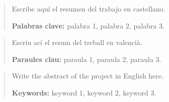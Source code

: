 
\begin{abstract}
	Escribe aquí el resumen del trabajo en castellano.

	\bigskip
	\textbf{Palabras clave:} palabra 1, palabra 2, palabra 3.
\end{abstract}

\begin{abstract}
	Escriu ací el resum del treball en valencià.

	\bigskip
	\textbf{Paraules clau:} paraula 1, paraula 2, paraula 3.
\end{abstract}

\begin{abstract}
	Write the abstract of the project in English here.

	\bigskip
	\textbf{Keywords:} keyword 1, keyword 2, keyword 3.
\end{abstract}

